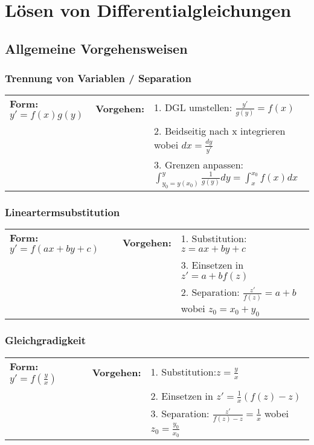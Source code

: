 
\section{Lösen von Differentialgleichungen}
    \subsection{Allgemeine Vorgehensweisen}
        \subsubsection{Trennung von Variablen / Separation}
            \begin{tabular}{p{4cm}p{1.5cm}p{10.5cm}}
                \textbf{Form:} $y' = f(x) g(y)$ &
                \textbf{Vorgehen:}              &
                1. DGL umstellen: $\frac{y'}{g(y)} = f(x)$ \\ &&
                2. Beidseitig nach x integrieren wobei $dx = \frac{dy}{y'}$ \\ &&
                3. Grenzen anpassen: $\int_{y_0=y(x_0)}^{y} \frac{1}{g(y)} dy =
                \int_{x}^{x_0}f(x) dx$
            \end{tabular}
            
        \subsubsection{Lineartermsubstitution}
            \begin{tabular}{p{4cm}p{1.5cm}p{10.5cm}}
                \textbf{Form:} $y'=f(ax+by+c)$   &
                \textbf{Vorgehen:}               &
                1. Substitution: $z=ax+by+c$ \\ &&
                3. Einsetzen in $z'=a+bf(z)$\\ &&
                2. Separation: $\frac{z'}{f(z)} = a + b$ wobei $z_0 = x_0 + y_0$
            \end{tabular}
                
        \subsubsection{Gleichgradigkeit}
            \begin{tabular}{p{4cm}p{1.5cm}p{10.5cm}}
                \textbf{Form:} $y'=f(\frac{y}{x})$ &
                \textbf{Vorgehen:}                &
                1. Substitution:\quad $z=\frac{y}{x}$\\ &&
                2. Einsetzen in $z'=\frac{1}{x}(f(z)-z)$\\ &&
                3. Separation: $\frac{z'}{f(z)-z} = \frac{1}{x}$ wobei $z_0 = \frac{y_0}{x_0}$ 
            \end{tabular}
            

